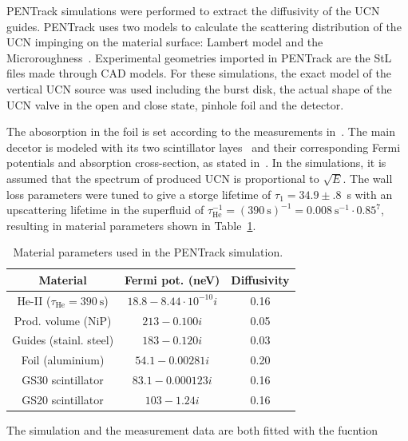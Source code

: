 PENTrack simulations were performed to extract the diffusivity of the
UCN guides. PENTrack uses two models to calculate the scattering
distribution of the UCN impinging on the material surface: Lambert
model and the Microroughness~\cite{Steyerl1972}. Experimental
geometries imported in PENTrack are the StL files made through CAD
models. For these simulations, the exact model of the vertical UCN
source was used including the burst disk, the actual shape of the UCN
valve in the open and close state, pinhole foil and the detector.

The abosorption in the foil is set according to the measurements
in~\cite{atchison2009transmission}. The main decetor is modeled with
its two scintillator layes~\cite{jamieson2017characterization} and
their corresponding Fermi potentials and absorption cross-section, as
stated in~\cite{Ban2016}.  In the simulations, it is assumed that the
spectrum of produced UCN is proportional to $\sqrt{E}$. The wall loss
parameters were tuned to give a storge lifetime of
$\tau_1 = 34.9 \pm .8$~s with an upscattering lifetime in the
superfluid of
$\tau_{\mathrm{He}}^{-1} = (390~\mathrm{s})^{-1} =
0.008~\mathrm{s}^{-1}\cdot 0.85^{7}$, resulting in material parameters
shown in Table~\ref{tab:materials}.


\begin{table}
  \centering
\begin{tabular}{|c|c|c|}
  \hline
Material & Fermi pot. (neV) & Diffusivity \\
\hline
He-II ($\tau_\mathrm{He} = \SI{390}{\second}$) & $18.8 - 8.44\cdot10^{-10} i$ & 0.16 \\
Prod. volume (NiP) & $213 - 0.100 i$ & 0.05 \\
Guides (stainl. steel) & $183 - 0.120 i$ & 0.03 \\
Foil (aluminium) & $54.1 - 0.00281 i$ & 0.20 \\
GS30 scintillator & $83.1 - 0.000123 i$ & 0.16 \\
  GS20 scintillator & $103 - 1.24 i$ & 0.16 \\
  \hline
\end{tabular}
\caption{Material parameters used in the PENTrack simulation.~\cite{atchison2009transmission,Ban2016,sears1992neutron}}
\label{tab:materials}
\end{table}

The simulation and the measurement data are both fitted with the fucntion

